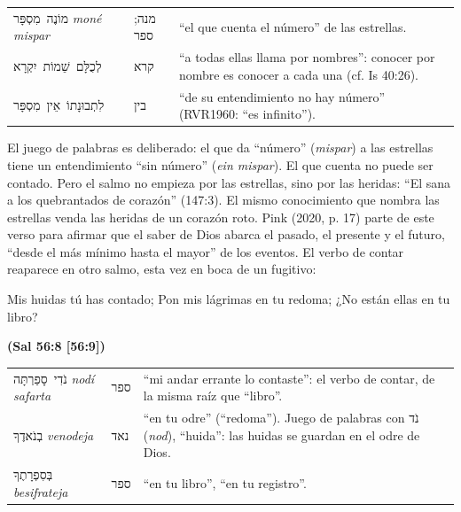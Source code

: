 \documentclass[11pt,letterpaper]{article}
\newcommand{\heb}[1]{\mbox{\foreignlanguage{hebrew}{#1}}}
\newcommand{\fuente}[1]{\par\hfill{\upshape\bfseries\small\textcolor{azul}{#1}}}
\begin{document}
\begin{filologia}[Sal 147:4--5]
\begin{tabular}{@{}L{3.2cm}L{1.6cm}L{10cm}@{}}
\heb{מוֹנֶה מִסְפָּר} \emph{moné mispar} & \heb{מנה}; \heb{ספר} & ``el que cuenta el número'' de las estrellas. \\[2pt]
\heb{לְכֻלָּם שֵׁמוֹת יִקְרָא} & \heb{קרא} & ``a todas ellas llama por nombres'': conocer por nombre es conocer a cada una (cf. Is 40:26). \\[2pt]
\heb{לִתְבוּנָתוֹ אֵין מִסְפָּר} & \heb{בין} & ``de su entendimiento no hay número'' (RVR1960: ``es infinito''). \\
\end{tabular}
\end{filologia}

El juego de palabras es deliberado: el que da ``número'' (\emph{mispar}) a las estrellas tiene un entendimiento ``sin número'' (\emph{ein mispar}). El que cuenta no puede ser contado. Pero el salmo no empieza por las estrellas, sino por las heridas: ``El sana a los quebrantados de corazón'' (147:3). El mismo conocimiento que nombra las estrellas venda las heridas de un corazón roto. Pink (2020, p. 17) parte de este verso para afirmar que el saber de Dios abarca el pasado, el presente y el futuro, ``desde el más mínimo hasta el mayor'' de los eventos. El verbo de contar reaparece en otro salmo, esta vez en boca de un fugitivo:

\begin{cita}Mis huidas tú has contado; Pon mis lágrimas en tu redoma; ¿No están ellas en tu libro?\fuente{(Sal 56:8 [56:9])}\end{cita}

\begin{filologia}
\begin{tabular}{@{}L{3.2cm}L{1.6cm}L{10cm}@{}}
\heb{נֹדִי סָפַרְתָּה} \emph{nodí safarta} & \heb{ספר} & ``mi andar errante lo contaste'': el verbo de contar, de la misma raíz que ``libro''. \\[2pt]
\heb{בְנֹאדֶךָ} \emph{venodeja} & \heb{נאד} & ``en tu odre'' (``redoma''). Juego de palabras con \heb{נֹד} (\emph{nod}), ``huida'': las huidas se guardan en el odre de Dios. \\[2pt]
\heb{בְּסִפְרָתֶךָ} \emph{besifrateja} & \heb{ספר} & ``en tu libro'', ``en tu registro''. \\
\end{tabular}
\end{filologia}
\end{document}
